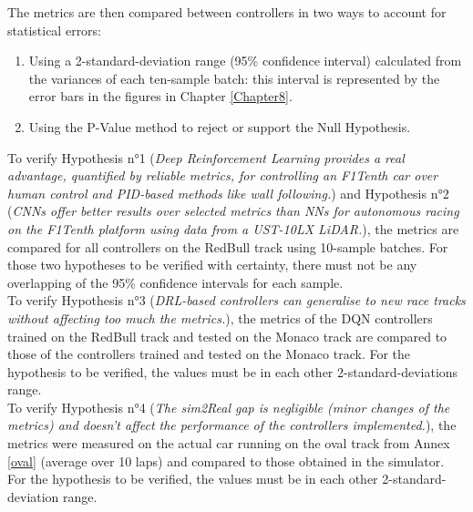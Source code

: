The metrics are then compared between controllers in two ways to account for statistical errors:
\begin{enumerate}
	\item Using a 2-standard-deviation range (95\% confidence interval) calculated from the variances of each ten-sample batch: this interval is represented by the error bars in the figures in Chapter \ref{Chapter8}.
	\item Using the P-Value method to reject or support the Null Hypothesis.
\end{enumerate}

To verify Hypothesis n°1 (\textit{Deep Reinforcement Learning provides a real advantage, quantified by reliable metrics, for controlling an F1Tenth car over human control and PID-based methods like wall following.}) and Hypothesis n°2 (\textit{CNNs offer better results over selected metrics than NNs for autonomous racing on the F1Tenth platform using data from a UST-10LX LiDAR.}), the metrics are compared for all controllers on the RedBull track using 10-sample batches. For those two hypotheses to be verified with certainty, there must not be any overlapping of the 95\% confidence intervals for each sample. \\
To verify Hypothesis n°3 (\textit{DRL-based controllers can generalise to new race tracks without affecting too much the metrics.}), the metrics of the DQN controllers trained on the RedBull track and tested on the Monaco track are compared to those of the controllers trained and tested on the Monaco track. For the hypothesis to be verified, the values must be in each other 2-standard-deviations range. \\
To verify Hypothesis n°4 (\textit{The sim2Real gap is negligible (minor changes of the metrics) and doesn't affect the performance of the controllers implemented.}), the metrics were measured on the actual car running on the oval track from Annex \ref{oval} (average over 10 laps) and compared to those obtained in the simulator. For the hypothesis to be verified, the values must be in each other 2-standard-deviation range. 
